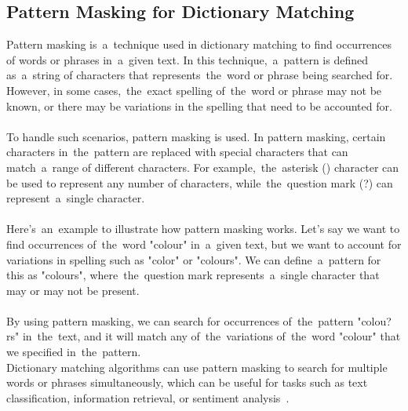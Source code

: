 \subsection{Pattern Masking for Dictionary Matching}\label{subsec:pmdm}
Pattern masking is~a~technique used in dictionary matching to find occurrences of words or phrases in~a~given text.
In this technique,~a~pattern  is defined as~a~string of characters that represents~the~word or phrase being searched for.
However, in some cases,~the~exact spelling of~the~word or phrase may not be known, or there may be variations in the
spelling that need to be accounted for.\\
\\
To handle such scenarios, pattern masking is used. In pattern masking, certain characters in~the~pattern are replaced
with special characters that can match~a~range of different characters. For example,~the~asterisk (\*) character can be
used to represent any number of characters, while~the~question mark (?) can represent~a~single character.\\
\\
Here's~an~example to illustrate how pattern masking works. Let's say we want to find occurrences of~the~word
"colour" in~a~given text, but we want to account for variations in spelling such as "color" or "colours".
We can define~a~pattern for this as "colours", where~the~question mark represents~a~single character that
may or may not be present.\\
\\
By using pattern masking, we can search for occurrences of~the~pattern "colou?rs" in~the~text, and it will match
any of~the~variations of~the~word "colour" that we specified in~the~pattern.\\
Dictionary matching algorithms can use pattern masking to search for multiple words or phrases simultaneously,
which can be useful for tasks such as text classification, information retrieval, or sentiment analysis~\cite{pmdm}.

